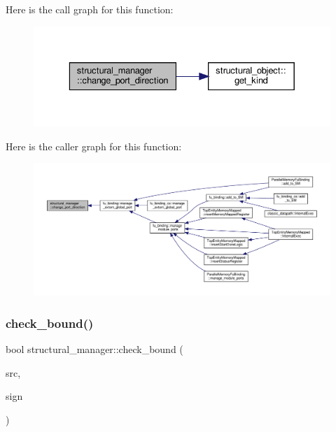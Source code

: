 Here is the call graph for this function\+:
\nopagebreak
\begin{figure}[H]
\begin{center}
\leavevmode
\includegraphics[width=329pt]{d7/d6b/classstructural__manager_a8925f8cfa41428e1221c2fead8ce10ec_cgraph}
\end{center}
\end{figure}
Here is the caller graph for this function\+:
\nopagebreak
\begin{figure}[H]
\begin{center}
\leavevmode
\includegraphics[width=350pt]{d7/d6b/classstructural__manager_a8925f8cfa41428e1221c2fead8ce10ec_icgraph}
\end{center}
\end{figure}
\mbox{\label{classstructural__manager_aa8a37e742bc04d56360230d1a249445a}} 
\subsubsection{\texorpdfstring{check\+\_\+bound()}{check\_bound()}}
{\footnotesize\ttfamily bool structural\+\_\+manager\+::check\+\_\+bound (\begin{DoxyParamCaption}\item[{\hyperlink{structural__objects_8hpp_a8ea5f8cc50ab8f4c31e2751074ff60b2}{structural\+\_\+object\+Ref}}]{src,  }\item[{\hyperlink{structural__objects_8hpp_a8ea5f8cc50ab8f4c31e2751074ff60b2}{structural\+\_\+object\+Ref}}]{sign }\end{DoxyParamCaption})\hspace{0.3cm}{\ttfamily [private]}}



